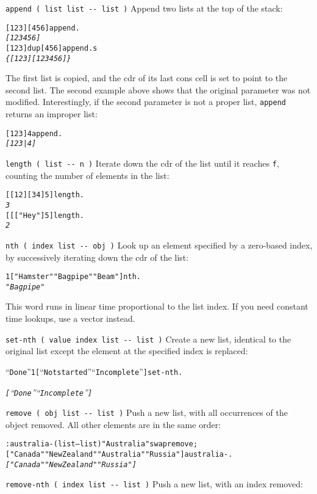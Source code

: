 \documentclass[english]{article}
\begin{document}
\texttt{append ( list list -{}- list )} Append two lists at the
top of the stack:

\begin{alltt}
{[} 1 2 3 {]} {[} 4 5 6 {]} append .
\emph{{[} 1 2 3 4 5 6 {]}}
{[} 1 2 3 {]} dup {[} 4 5 6 {]} append .s
\emph{\{ {[} 1 2 3 {]} {[} 1 2 3 4 5 6 {]} \}}
\end{alltt}
The first list is copied, and the cdr of its last cons cell is set
to point to the second list. The second example above shows that the original
parameter was not modified. Interestingly, if the second parameter
is not a proper list, \texttt{append} returns an improper list:

\begin{alltt}
{[} 1 2 3 {]} 4 append .
\emph{{[} 1 2 3 | 4 {]}}
\end{alltt}
\texttt{length ( list -{}- n )} Iterate down the cdr of the list until
it reaches \texttt{f}, counting the number of elements in the list:

\begin{alltt}
{[} {[} 1 2 {]} {[} 3 4 {]} 5 {]} length .
\emph{3}
{[} {[} {[} "Hey" {]} 5 {]} length .
\emph{2}
\end{alltt}
\texttt{nth ( index list -{}- obj )} Look up an element specified
by a zero-based index, by successively iterating down the cdr of the
list:

\begin{alltt}
1 {[} "Hamster" "Bagpipe" "Beam" {]} nth .
\emph{"Bagpipe"}
\end{alltt}
This word runs in linear time proportional to the list index. If you
need constant time lookups, use a vector instead.

\texttt{set-nth ( value index list -{}- list )} Create a new list,
identical to the original list except the element at the specified
index is replaced:

\begin{alltt}
{}``Done'' 1 {[} {}``Not started'' {}``Incomplete'' {]} set-nth .

\emph{{[} {}``Done'' {}``Incomplete'' {]}}
\end{alltt}
\texttt{remove ( obj list -{}- list )} Push a new list, with all occurrences
of the object removed. All other elements are in the same order:

\begin{alltt}
: australia- ( list -- list ) "Australia" swap remove ;
{[} "Canada" "New Zealand" "Australia" "Russia" {]} australia- .
\emph{{[} "Canada" "New Zealand" "Russia" {]}}
\end{alltt}
\texttt{remove-nth ( index list -{}- list )} Push a new list, with
an index removed:
\end{document}
